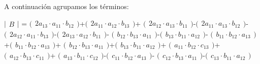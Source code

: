 \documentclass[11pt]{article}
\begin{document}
    A continuación agrupamos los términos:

    \(\bigl|\begin{matrix}B\end{matrix}\bigr|\) =
\(\bigl(\begin{matrix}2a_{13} \cdot a_{11} \cdot b_{12}\end{matrix}\bigr)\)+\(\bigl(\begin{matrix}2a_{11} \cdot a_{12} \cdot b_{13}\end{matrix}\bigr)\)+
\(\bigl(\begin{matrix}2a_{12} \cdot a_{13} \cdot b_{11}\end{matrix}\bigr)\)-\(\bigl(\begin{matrix}2a_{11} \cdot a_{13} \cdot b_{12}\end{matrix}\bigr)\)-
\(\bigl(\begin{matrix}2a_{12} \cdot a_{11} \cdot b_{13}\end{matrix}\bigr)\)-\(\bigl(\begin{matrix}2a_{13} \cdot a_{12} \cdot b_{11}\end{matrix}\bigr)\)-
\(\bigl(\begin{matrix}b_{12} \cdot b_{13} \cdot a_{11}\end{matrix}\bigr)\)-\(\bigl(\begin{matrix}b_{13} \cdot b_{11} \cdot a_{12}\end{matrix}\bigr)\)-
\(\bigl(\begin{matrix}b_{11} \cdot b_{12} \cdot a_{13}\end{matrix}\bigr)\)+\(\bigl(\begin{matrix}b_{11} \cdot b_{12} \cdot a_{13}\end{matrix}\bigr)\)+
\(\bigl(\begin{matrix}b_{12} \cdot b_{13} \cdot a_{11}\end{matrix}\bigr)\)+\(\bigl(\begin{matrix}b_{13} \cdot b_{11} \cdot a_{12}\end{matrix}\bigr)\)+
\(\bigl(\begin{matrix}a_{11} \cdot b_{12} \cdot c_{13}\end{matrix}\bigr)\)+\(\bigl(\begin{matrix}a_{12} \cdot b_{13} \cdot c_{11}\end{matrix}\bigr)\)+
\(\bigl(\begin{matrix}a_{13} \cdot b_{11} \cdot c_{12}\end{matrix}\bigr)\)-\(\bigl(\begin{matrix}c_{11} \cdot b_{12} \cdot a_{13}\end{matrix}\bigr)\)-
\(\bigl(\begin{matrix}c_{12} \cdot b_{13} \cdot a_{11}\end{matrix}\bigr)\)-\(\bigl(\begin{matrix}c_{13} \cdot b_{11} \cdot a_{12}\end{matrix}\bigr)\)
\end{document}
